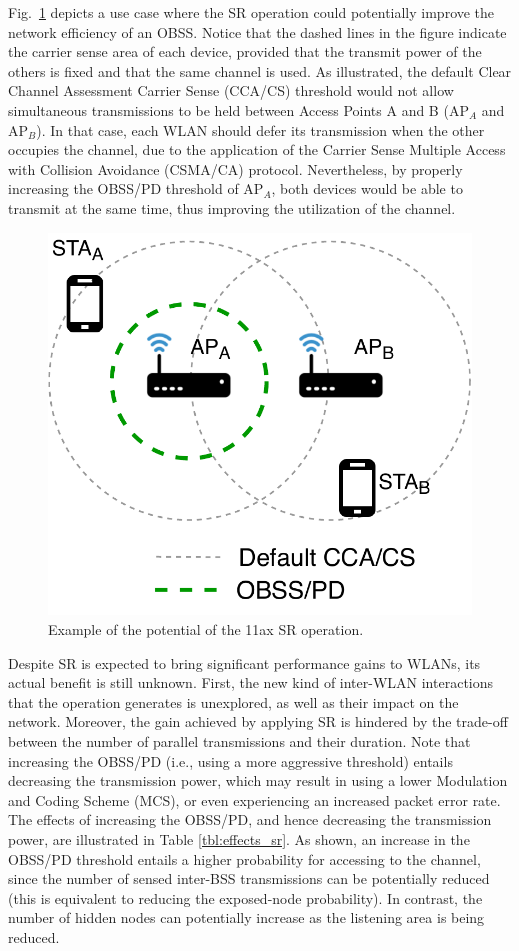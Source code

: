 \documentclass[conference]{IEEEtran}
\begin{document}
	Fig.~\ref{fig:example_sr} depicts a use case where the SR operation could potentially improve the network efficiency of an OBSS. Notice that the dashed lines in the figure indicate the carrier sense area of each device, provided that the transmit power of the others is fixed and that the same channel is used. As illustrated, the default Clear Channel Assessment Carrier Sense (CCA/CS) threshold would not allow simultaneous transmissions to be held between Access Points A and B (AP$_A$ and AP$_B$). In that case, each WLAN should defer its transmission when the other occupies the channel, due to the application of the Carrier Sense Multiple Access with Collision Avoidance (CSMA/CA) protocol. Nevertheless, by properly increasing the OBSS/PD threshold of AP$_A$, both devices would be able to transmit at the same time, thus improving the utilization of the channel.
	\begin{figure}[ht!]
		\centering
		\includegraphics[width=0.6\columnwidth]{fig_1}
		\caption{Example of the potential of the 11ax SR operation.}
		\label{fig:example_sr}
	\end{figure}
	
	Despite SR is expected to bring significant performance gains to WLANs, its actual benefit is still unknown. First, the new kind of inter-WLAN interactions that the operation generates is unexplored, as well as their impact on the network. Moreover, the gain achieved by applying SR is hindered by the trade-off between the number of parallel transmissions and their duration. Note that increasing the OBSS/PD (i.e., using a more aggressive threshold) entails decreasing the transmission power, which may result in using a lower Modulation and Coding Scheme (MCS), or even experiencing an increased packet  error rate. The effects of increasing the OBSS/PD, and hence decreasing the transmission power, are illustrated in Table \ref{tbl:effects_sr}. As shown, an increase in the OBSS/PD threshold entails a higher probability for accessing to the channel, since the number of sensed inter-BSS transmissions can be potentially reduced (this is equivalent to reducing the exposed-node probability). In contrast, the number of hidden nodes can potentially increase as the listening area is being reduced. %
	
\end{document}
